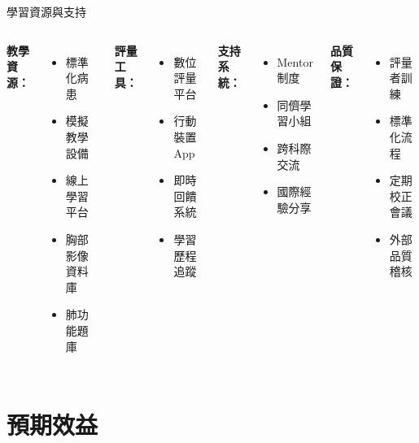 \documentclass[aspectratio=169]{beamer}
\begin{document}
\begin{frame}{學習資源與支持}
\begin{columns}[c]
\textbf{教學資源：}
\begin{itemize}
\item 標準化病患
\item 模擬教學設備
\item 線上學習平台
\item 胸部影像資料庫
\item 肺功能題庫
\end{itemize}

\textbf{評量工具：}
\begin{itemize}
\item 數位評量平台
\item 行動裝置App
\item 即時回饋系統
\item 學習歷程追蹤
\end{itemize}

\textbf{支持系統：}
\begin{itemize}
\item Mentor制度
\item 同儕學習小組
\item 跨科際交流
\item 國際經驗分享
\end{itemize}

\textbf{品質保證：}
\begin{itemize}
\item 評量者訓練
\item 標準化流程
\item 定期校正會議
\item 外部品質稽核
\end{itemize}
\end{columns}
\end{frame}

\section{預期效益}
\end{document}
